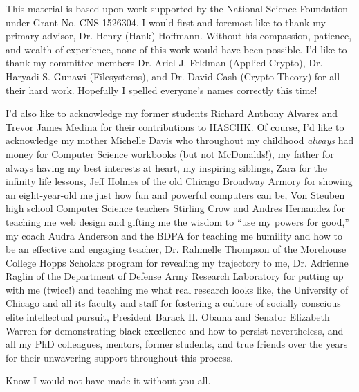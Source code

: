 \acknowledgments
This material is based upon work supported by the National Science Foundation
under Grant No. CNS-1526304. I would first and foremost like to thank my primary
advisor, Dr. Henry (Hank) Hoffmann. Without his compassion, patience, and wealth
of experience, none of this work would have been possible. I'd like to thank my
committee members Dr. Ariel J. Feldman (Applied Crypto), Dr. Haryadi S. Gunawi
(Filesystems), and Dr. David Cash (Crypto Theory) for all their hard work.
Hopefully I spelled everyone's names correctly this time!

I'd also like to acknowledge my former students Richard Anthony Alvarez and
Trevor James Medina for their contributions to HASCHK. Of course, I'd like to
acknowledge my mother Michelle Davis who throughout my childhood \emph{always}
had money for Computer Science workbooks (but not McDonalds!), my father for
always having my best interests at heart, my inspiring siblings, Zara for the
infinity life lessons, Jeff Holmes of the old Chicago Broadway Armory for
showing an eight-year-old me just how fun and powerful computers can be, Von
Steuben high school Computer Science teachers Stirling Crow and Andres Hernandez
for teaching me web design and gifting me the wisdom to ``use my powers for
good,'' my coach Audra Anderson and the BDPA for teaching me humility and how to
be an effective and engaging teacher, Dr. Rahmelle Thompson of the Morehouse
College Hopps Scholars program for revealing my trajectory to me, Dr. Adrienne
Raglin of the Department of Defense Army Research Laboratory for putting up with
me (twice!) and teaching me what real research looks like, the University of
Chicago and all its faculty and staff for fostering a culture of socially
conscious elite intellectual pursuit, President Barack H. Obama and Senator
Elizabeth Warren for demonstrating black excellence and how to persist
nevertheless, and all my PhD colleagues, mentors, former students, and true
friends over the years for their unwavering support throughout this process.

Know I would not have made it without you all.
